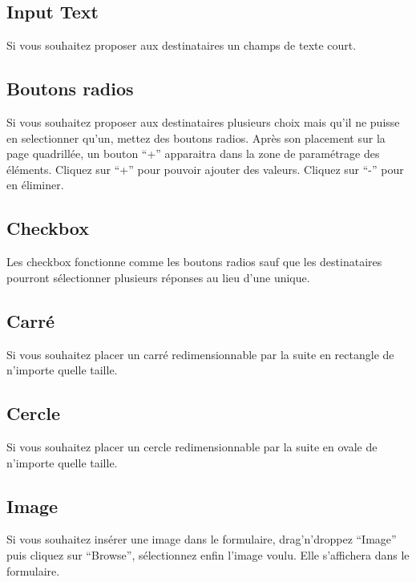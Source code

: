 \documentclass[a4paper,11pt,final]{report}
\begin{document}
\subsection{Input Text}
Si vous souhaitez proposer aux destinataires un champs de texte court.
\subsection{Boutons radios}
Si vous souhaitez proposer aux destinataires plusieurs choix mais qu'il ne puisse en selectionner qu'un, mettez des boutons radios. Après son placement sur la page quadrillée, un bouton ``+'' apparaitra dans la zone de paramétrage des éléments. Cliquez sur ``+'' pour pouvoir ajouter des valeurs. Cliquez sur ``-'' pour en éliminer.
\subsection{Checkbox}
Les checkbox fonctionne comme les boutons radios sauf que les destinataires pourront sélectionner plusieurs réponses au lieu d'une unique.
\subsection{Carré}
Si vous souhaitez placer un carré redimensionnable par la suite en rectangle de n'importe quelle taille.
\subsection{Cercle}
Si vous souhaitez placer un cercle redimensionnable par la suite en ovale de n'importe quelle taille.
\subsection{Image}
Si vous souhaitez insérer une image dans le formulaire, drag'n'droppez ``Image'' puis cliquez sur ``Browse'', sélectionnez enfin l'image voulu. Elle s'affichera dans le formulaire.
\end{document}
